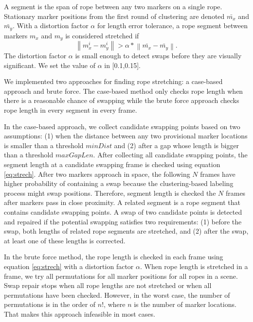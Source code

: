 A segment is the span of rope between any two markers on a single rope. Stationary marker positions from the first round of clustering are denoted $\bar{m_x}$ and $\bar{m_y}$. With a distortion factor $\alpha$ for length error tolerance, a rope segment between markers $m_x$ and $m_y$ is considered stretched if
\begin{equation}
\left\|m_x^i-m_y^i \right\|>\alpha*\left\|\bar{m_x}-\bar{m_y}\right\|.
\label{eq:strech}
\end{equation}
The distortion factor $\alpha$ is small enough to detect swaps before they are visually significant. We set the value of $\alpha$ in [0.1,0.15]. 

We implemented two approaches for finding rope stretching: a case-based approach and brute force. The case-based method only checks rope length when there is a reasonable chance of swapping while the brute force approach checks rope length in every segment in every frame.
 
In the case-based approach, we collect candidate swapping points based on two assumptions: (1) when the distance between any two provisional marker locations is smaller than a threshold $minDist$ and (2) after a gap whose length is bigger than a threshold $maxGapLen$. After collecting all candidate swapping points, the segment length at a candidate swapping frame is checked using equation \ref{eq:strech}. After two markers approach in space, the following $N$ frames have higher probability of containing a swap because the clustering-based labeling process might swap positions.  Therefore, segment length is checked the $N$ frames after markers pass in close proximity.  A related segment is a rope segment that contains candidate swapping points.  A swap of two candidate points is detected and repaired if the potential swapping satisfies two requirements: (1) before the swap, both lengths of related rope segments are stretched, and (2) after the swap, at least one of these lengths is corrected.

In the brute force method, the rope length is checked in each frame using equation \ref{eq:strech} with a distortion factor $\alpha$.  When rope length is stretched in a frame, we try all permutations for all marker positions for all ropes in a scene.  Swap repair stops when all rope lengths are not stretched or when all permutations have been checked.  However, in the worst case, the number of permutations is in the order of $n!$, where $n$ is the number of marker locations. That makes this approach infeasible in most cases.

